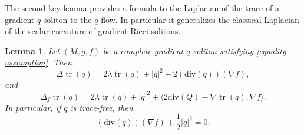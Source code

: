\documentclass{amsart}
\theoremstyle{plain}
\newtheorem{lemma}[theorem]{\bf Lemma}
\numberwithin{equation}{section}
\begin{document}
The second key lemma  provides a formula to the Laplacian of the trace of a gradient $q$-soliton to the $q$-flow. In particular it generalizes the classical Laplacian of the scalar curvature of gradient Ricci solitons.
\begin{lemma}\label{Laplacian of the trace}
Let $(M,g,f)$ be a complete gradient $q$-soliton satisfying \eqref{equality assumption}. Then
\begin{equation}\label{eq with trace}
\Delta \operatorname{tr}(q)=2\lambda \operatorname{tr}(q)+|q|^2+2(\mathrm{div}(q))(\nabla f),
\end{equation}
and
\begin{equation}\label{eq f-Laplac of trace}
\Delta_f \operatorname{tr}(q)=2\lambda\operatorname{tr}(q)+|q|^2+\langle 2\mathrm{div}(Q)-\nabla \operatorname{tr}(q),\nabla f\rangle.
\end{equation}
In particular, if $q$ is trace-free, then
    \begin{equation}\label{eq no trace}
        (\mathrm{div}(q))(\nabla f)+\frac{1}{2}|q|^2=0.
    \end{equation}
\end{lemma}
\end{document}
